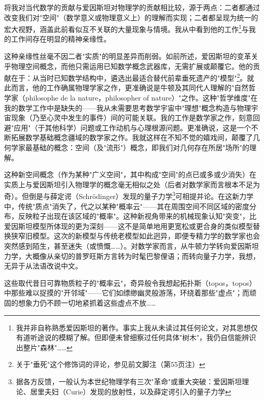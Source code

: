将我对当代数学的贡献与爱因斯坦对物理学的贡献相比较，源于两点：二者都通过改变我们对"空间"（数学意义或物理意义上）的理解而实现；二者都呈现为统一的宏大视野，涵盖此前看似互不关联的大量现象与情境。我从中看到他的工作\footnote{我并非自称熟悉爱因斯坦的著作。事实上我从未读过其任何论文，对其思想仅有道听途说的模糊了解。但即便未曾细察过任何具体"树木"，我仍自信能辨识出整片"森林"……}与我的工作间存在明显的精神亲缘性。

这种亲缘性丝毫不因二者"实质"的明显差异而削弱。如前所述，爱因斯坦的变革关乎物理空间概念，而他只需运用已知数学概念武器库，无需扩展或颠覆它。他的贡献在于：从当时已知数学结构中，遴选出最适合替代前辈垂死遗产的"模型"\footnote{关于"垂死"这个修饰词的评论，参见前文脚注（第55页注）}。就此而言，他的工作确属物理学家之作，更准确说是牛顿及其同代人理解的"自然哲学家（philosophe de la nature，philosopher of nature）"之作。这种"哲学维度"在我的数学工作中是缺失的——我从未需要思考数学宇宙中"理想"概念构造与物理宇宙现象（乃至心灵中发生的事件）间的可能关联。我的工作是数学家之作，刻意回避"应用"（于其他科学）问题或工作动机与心理根源问题。更准确说，这是一个不断拓展数学基础概念疆域的数学家之作。我就这样在不知不觉的嬉戏间，颠覆了几何学家最基础的概念：空间（及"流形"）概念，即我们对几何存在所居"场所"的理解。

这种新空间概念（作为某种"广义空间"，其中构成"空间"的点已或多或少消失）在实质上与爱因斯坦引入物理学的概念毫无相似之处（后者对数学家而言根本不足为奇）。但倒是与薛定谔（Schrödinger）发现的量子力学\footnote{据各方反馈，一般认为本世纪物理学有三次"革命"或重大突破：爱因斯坦理论、居里夫妇（Curie）发现的放射性，以及薛定谔引入的量子力学}可相提并论。在这新力学中，传统"质点"消失了，代之以某种"概率云"——其在周围空间不同区域的密度分布，反映粒子出现在该区域的"概率"。这种新视角带来的机械现象认知"突变"，比爱因斯坦模型所体现的更为深刻——这不是简单地用更宽松或更合身的类似模型替换狭窄旧模型。这次的新模型与传统老模型如此迥异，即便专精力学的数学家也会突然感到陌生，甚至迷失（或愤慨……）。对数学家而言，从牛顿力学转向爱因斯坦力学，大概像从亲切的普罗旺斯方言转为时髦巴黎俚语；而转向量子力学，我想，无异于从法语改说中文。

这些取代昔日可靠物质粒子的"概率云"，奇异般令我想起拓扑斯（topos，topos）中那些难以捉摸的"开邻域"——它们如缥缈幽灵般游荡，环绕着那些"虚点"；而顽固的想象力仍不顾一切地紧抓着这些虚点不放……
